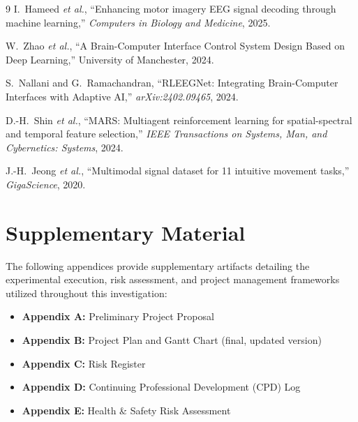 \documentclass[12pt, a4paper]{article}
\begin{document}
\begin{thebibliography}{9}
I.~Hameed \emph{et al.}, ``Enhancing motor imagery EEG signal decoding through machine learning,'' \textit{Computers in Biology and Medicine}, 2025.

W.~Zhao \emph{et al.}, ``A Brain-Computer Interface Control System Design Based on Deep Learning,'' University of Manchester, 2024.

S.~Nallani and G.~Ramachandran, ``RLEEGNet: Integrating Brain-Computer Interfaces with Adaptive AI,'' \textit{arXiv:2402.09465}, 2024.

D.-H.~Shin \emph{et al.}, ``MARS: Multiagent reinforcement learning for spatial-spectral and temporal feature selection,'' \textit{IEEE Transactions on Systems, Man, and Cybernetics: Systems}, 2024.

J.-H.~Jeong \emph{et al.}, ``Multimodal signal dataset for 11 intuitive movement tasks,'' \textit{GigaScience}, 2020.
\end{thebibliography}

\newpage
\section*{Supplementary Material}

The following appendices provide supplementary artifacts detailing the experimental execution, risk assessment, and project management frameworks utilized throughout this investigation:

\begin{itemize}
    \item \textbf{Appendix A:} Preliminary Project Proposal
    \item \textbf{Appendix B:} Project Plan and Gantt Chart (final, updated version)
    \item \textbf{Appendix C:} Risk Register
    \item \textbf{Appendix D:} Continuing Professional Development (CPD) Log
    \item \textbf{Appendix E:} Health \& Safety Risk Assessment
\end{itemize}
\end{document}
